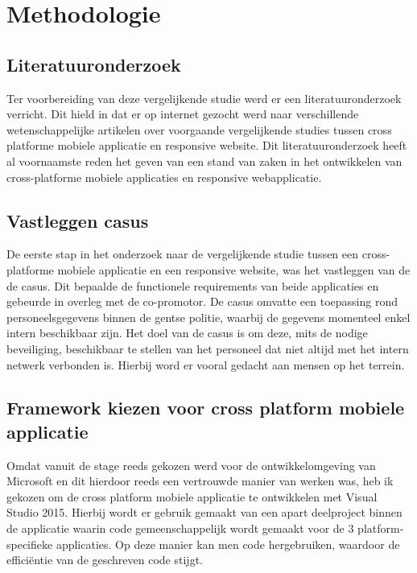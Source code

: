 
\chapter{Methodologie}
\label{ch:methodologie}


\section{Literatuuronderzoek}
Ter voorbereiding van deze vergelijkende studie werd er een literatuuronderzoek verricht.
Dit hield in dat er op internet gezocht werd naar verschillende wetenschappelijke artikelen over voorgaande vergelijkende studies
tussen cross platforme mobiele applicatie en responsive website. Dit literatuuronderzoek heeft al voornaamste reden het geven van
een stand van zaken in het ontwikkelen van cross-platforme mobiele applicaties en responsive webapplicatie.

\section{Vastleggen casus}
De eerste stap in het onderzoek naar de vergelijkende studie tussen een cross-platforme mobiele applicatie en een
responsive website, was het vastleggen van de de casus. Dit bepaalde de functionele requirements van beide applicaties en
gebeurde in overleg met de co-promotor. De casus omvatte een toepassing rond personeelsgegevens binnen de gentse politie,
waarbij de gegevens momenteel enkel intern beschikbaar zijn. Het doel van de casus is om deze, mits de nodige beveiliging, beschikbaar
te stellen van het personeel dat niet altijd met het intern netwerk verbonden is. Hierbij word er vooral gedacht aan mensen op het terrein.

\section{Framework kiezen voor cross platform mobiele applicatie}
Omdat vanuit de stage reeds gekozen werd voor de ontwikkelomgeving van Microsoft en dit hierdoor reeds een vertrouwde
manier van werken was, heb ik gekozen om de cross platform mobiele applicatie te ontwikkelen met Visual Studio 2015.
Hierbij wordt er gebruik gemaakt van een apart deelproject binnen de applicatie waarin code gemeenschappelijk wordt gemaakt voor
de 3 platform-specifieke applicaties. Op deze manier kan men code hergebruiken, waardoor de efficiëntie van de geschreven code stijgt.

